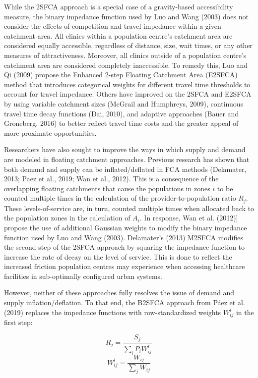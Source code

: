 \documentclass[]{elsarticle} %
\begin{document}
While the 2SFCA approach is a special case of a gravity-based
accessibility measure, the binary impedance function used by Luo and
Wang (2003) does not consider the effects of competition and travel
impedance within a given catchment area. All clinics within a population
centre's catchment area are considered equally accessible, regardless of
distance, size, wait times, or any other measures of attractiveness.
Moreover, all clinics outside of a population centre's catchment area
are considered completely inaccessible. To remedy this, Luo and Qi
(2009) propose the Enhanced 2-step Floating Catchment Area (E2SFCA)
method that introduces categorical weights for different travel time
thresholds to account for travel impedance. Others have improved on the
2SFCA and E2SFCA by using variable catchment sizes (McGrail and
Humphreys, 2009), continuous travel time decay functions (Dai, 2010),
and adaptive approaches (Bauer and Groneberg, 2016) to better reflect
travel time costs and the greater appeal of more proximate
opportunities.

Researchers have also sought to improve the ways in which supply and
demand are modeled in floating catchment approaches. Previous research
has shown that both demand and supply can be inflated/deflated in FCA
methods (Delamater, 2013; Paez et al., 2019; Wan et al., 2012). This is
a consequence of the overlapping floating catchments that cause the
populations in zones \(i\) to be counted multiple times in the
calculation of the provider-to-population ratio \(R_j\). These
levels-of-service are, in turn, counted multiple times when allocated
back to the population zones in the calculation of \(A_i\). In response,
Wan et al. (2012){]} propose the use of additional Gaussian weights to
modify the binary impedance function used by Luo and Wang (2003).
Delamater's (2013) M2SFCA modifies the second step of the 2SFCA approach
by squaring the impedance function to increase the rate of decay on the
level of service. This is done to reflect the increased friction
population centres may experience when accessing healthcare facilities
in sub-optimally configured urban systems.

However, neither of these approaches fully resolves the issue of demand
and supply inflation/deflation. To that end, the B2SFCA approach from
Páez et al. (2019) replaces the impedance functions with
row-standardized weights \(W_{ij}^{i}\) in the first step:

\[
R_j = \frac{S_j}{\sum_i{P_iW_{ij}^{i}}}
\] \[
W_{ij}^{i} = \frac{W_{ij}}{\sum_j W_{ij}}
\]
\end{document}
